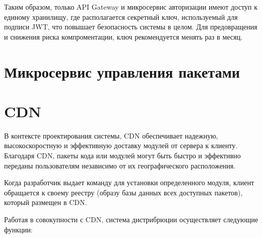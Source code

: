 Таким образом, только API Gateway и микросервис авторизации имеют доступ к единому хранилищу, где располагается секретный ключ, используемый для подписи JWT, что повышает безопасность системы в целом. Для предовращения и снижения риска компроментации, ключ рекомендуется менять раз в месяц. 

\section{Микросервис управления пакетами}

\section{CDN}


В контексте проектирования системы, CDN обеспечивает надежную, высокоскоростную и эффективную доставку модулей от сервера к клиенту. Благодаря CDN, пакеты кода или модулей могут быть быстро и эффективно переданы пользователям независимо от их географического расположения.

Когда разработчик выдает команду для установки определенного модуля, клиент обращается к своему реестру (образу базы данных всех доступных пакетов), который размещен в CDN.

Работая в совокупности с CDN, система дистрибрюции осуществляет следующие функции:

